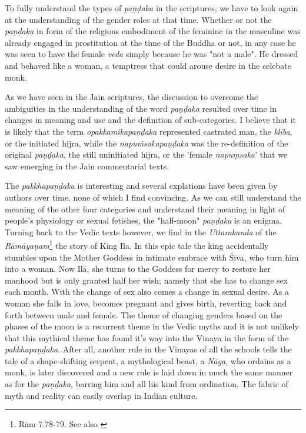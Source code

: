 To fully understand the types of {\em paṇḍaka} in the scriptures, we have to look again at the understanding of the gender roles at that time. Whether or not the {\em paṇḍaka} in form of the religious embodiment of the feminine in the masculine was already engaged in prostitution at the time of the Buddha or not, in any case he was seen to have the female {\em veda} simply because he was "not a male". He dressed and behaved like a woman, a temptress that could arouse desire in the celebate monk. 

As we have seen in the Jain scriptures, the discussion to overcome the ambiguities in the understanding of the word {\em paṇḍaka} resulted over time in changes in meaning and use and the definition of sub-categories. I believe that it is likely that the term {\em opakkamikapaṇḍaka} represented castrated man, the {\em klība}, or the initiated hijra, while the {\em napuṁsakapaṇḍaka} was the re-definition of the original {\em paṇḍaka}, the still uninitiated hijra, or the 'female {\em napuṃsaka}' that we saw emerging in the Jain commentarial texts.

The {\em pakkhapaṇḍaka} is interesting and several explations have been given by authors over time, none of which I find convincing. As we can still understand the meaning of the other four categories and understand their meaning in light of people's physiology or sexual fetishes, the "half-moon" {\em paṇḍaka} is an enigma. Turning back to the Vedic texts however, we find in the {\em Uttarakanda} of the {\em Rāmāyaṇam}\footnote{Rām 7.78-79. See also \cite{goldman}} the story of King Ila. In this epic tale the king accidentally stumbles upon the Mother Goddess in intimate embrace with Śiva, who turn him into a woman. Now Ilā, she turns to the Goddess for mercy to restore her manhood but is only granted half her wish; namely that she has to change sex each month. With the change of sex also comes a change in sexual desire. As a woman she falls in love, becomes pregnant and gives birth, reverting back and forth between male and female. The theme of changing genders based on the phases of the moon is a recurrent theme in the Vedic myths and it is not unlikely that this mythical theme has found it's way into the Vinaya in the form of the {\em pakkhapaṇḍaka}. After all, another rule in the Vinayas of all the schools tells the tale of a shape-shifting serpent, a mythological beast, a {\em Nāga}, who ordains as a monk, is later discovered and a new rule is laid down in much the same manner as for the {\em paṇḍaka}, barring him and all his kind from ordination. The fabric of myth and reality can easily overlap in Indian culture.

